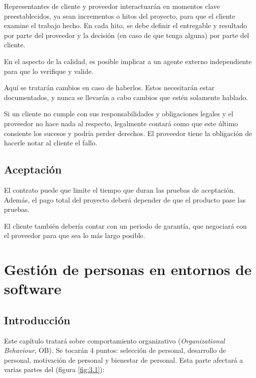 \documentclass[12pt]{article}
\begin{document}
{Representantes de cliente y proveedor interactuarán en momentos clave preestablecidos, ya sean incrementos o hitos del proyecto, para que el cliente examine el trabajo hecho. En cada hito, se debe definir el entregable y resultado por parte del proveedor y la decisión (en caso de que tenga alguna) por parte del cliente.} \bigskip

{En el aspecto de la calidad, es posible implicar a un agente externo independiente para que lo verifique y valide.} \bigskip

{Aquí se tratarán cambios en caso de haberlos. Estos necesitarán estar documentados, y nunca se llevarán a cabo cambios que estén solamente hablado.} \bigskip

{Si un cliente no cumple con sus responsabilidades y obligaciones legales y el proveedor no hace nada al respecto, legalmente contará como que este último consiente los sucesos y podría perder derechos. El proveedor tiene la obligación de hacerle notar al cliente el fallo.}

\subsection{Aceptación}
\label{10.6.0}

{El contrato puede que limite el tiempo que duran las pruebas de aceptación. Además, el pago total del proyecto deberá depender de que el producto pase las pruebas.} \bigskip

{El cliente también debería contar con un periodo de garantía, que negociará con el proveedor para que sea lo más largo posible.}

\newpage
\section[Gestión de personas en entornos de software]{Gestión de personas en entornos de \\software}
\label{11.0.0}

\subsection{Introducción}
\label{11.1.0}

{Este capítulo tratará sobre comportamiento organizativo (\textit{Organizational Behaviour}, OB). Se tocarán 4 puntos: selección de personal, desarrollo de personal, motivación de personal y bienestar de personal. Esta parte afectará a varias partes del  (figura \ref{fig:3.1}):}
\end{document}
